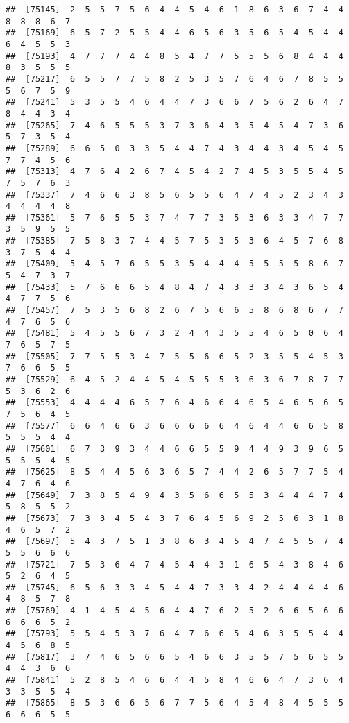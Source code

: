 \documentclass[
]{book}
\begin{document}
\begin{verbatim}
##  [75145]  2  5  5  7  5  6  4  4  5  4  6  1  8  6  3  6  7  4  4  8  8  8  6  7
##  [75169]  6  5  7  2  5  5  4  4  6  5  6  3  5  6  5  4  5  4  4  6  4  5  5  3
##  [75193]  4  7  7  7  4  4  8  5  4  7  7  5  5  5  6  8  4  4  4  8  3  5  5  5
##  [75217]  6  5  5  7  7  5  8  2  5  3  5  7  6  4  6  7  8  5  5  5  6  7  5  9
##  [75241]  5  3  5  5  4  6  4  4  7  3  6  6  7  5  6  2  6  4  7  8  4  4  3  4
##  [75265]  7  4  6  5  5  5  3  7  3  6  4  3  5  4  5  4  7  3  6  5  7  3  5  4
##  [75289]  6  6  5  0  3  3  5  4  4  7  4  3  4  4  3  4  5  4  5  7  7  4  5  6
##  [75313]  4  7  6  4  2  6  7  4  5  4  2  7  4  5  3  5  5  4  5  7  5  7  6  3
##  [75337]  7  4  6  6  3  8  5  6  5  5  6  4  7  4  5  2  3  4  3  4  4  4  4  8
##  [75361]  5  7  6  5  5  3  7  4  7  7  3  5  3  6  3  3  4  7  7  3  5  9  5  5
##  [75385]  7  5  8  3  7  4  4  5  7  5  3  5  3  6  4  5  7  6  8  3  7  5  4  4
##  [75409]  5  4  5  7  6  5  5  3  5  4  4  4  5  5  5  5  8  6  7  5  4  7  3  7
##  [75433]  5  7  6  6  6  5  4  8  4  7  4  3  3  3  4  3  6  5  4  4  7  7  5  6
##  [75457]  7  5  3  5  6  8  2  6  7  5  6  6  5  8  6  8  6  7  7  4  7  6  5  6
##  [75481]  5  4  5  5  6  7  3  2  4  4  3  5  5  4  6  5  0  6  4  7  6  5  7  5
##  [75505]  7  7  5  5  3  4  7  5  5  6  6  5  2  3  5  5  4  5  3  7  6  6  5  5
##  [75529]  6  4  5  2  4  4  5  4  5  5  5  3  6  3  6  7  8  7  7  5  3  6  2  6
##  [75553]  4  4  4  4  6  5  7  6  4  6  6  4  6  5  4  6  5  6  5  7  5  6  4  5
##  [75577]  6  6  4  6  6  3  6  6  6  6  6  4  6  4  4  6  6  5  8  5  5  5  4  4
##  [75601]  6  7  3  9  3  4  4  6  6  5  5  9  4  4  9  3  9  6  5  5  5  5  4  5
##  [75625]  8  5  4  4  5  6  3  6  5  7  4  4  2  6  5  7  7  5  4  4  7  6  4  6
##  [75649]  7  3  8  5  4  9  4  3  5  6  6  5  5  3  4  4  4  7  4  5  8  5  5  2
##  [75673]  7  3  3  4  5  4  3  7  6  4  5  6  9  2  5  6  3  1  8  4  6  5  7  2
##  [75697]  5  4  3  7  5  1  3  8  6  3  4  5  4  7  4  5  5  7  4  5  5  6  6  6
##  [75721]  7  5  3  6  4  7  4  5  4  4  3  1  6  5  4  3  8  4  6  5  2  6  4  5
##  [75745]  6  5  6  3  3  4  5  4  4  7  3  3  4  2  4  4  4  4  6  4  8  5  7  8
##  [75769]  4  1  4  5  4  5  6  4  4  7  6  2  5  2  6  6  5  6  6  6  6  6  5  2
##  [75793]  5  5  4  5  3  7  6  4  7  6  6  5  4  6  3  5  5  4  4  4  5  6  8  5
##  [75817]  3  7  4  6  5  6  6  5  4  6  6  3  5  5  7  5  6  5  5  4  4  3  6  6
##  [75841]  5  2  8  5  4  6  6  4  4  5  8  4  6  6  4  7  3  6  4  3  3  5  5  4
##  [75865]  8  5  3  6  6  5  6  7  7  5  6  4  5  4  8  4  5  5  5  6  6  6  5  5

\end{verbatim}
\end{document}
